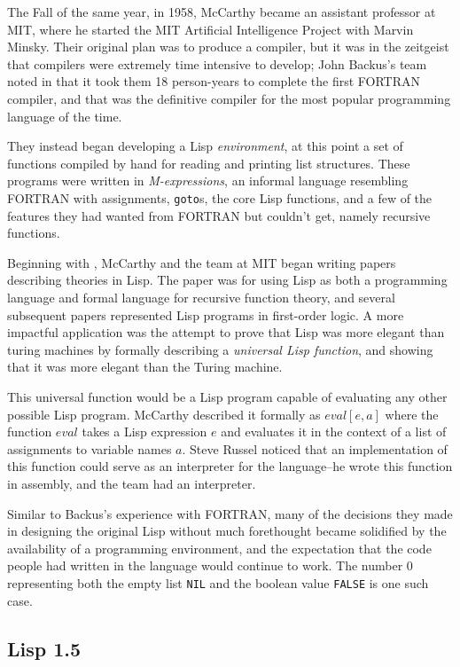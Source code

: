 The Fall of the same year, in 1958,
McCarthy became an assistant professor at MIT, where he started
the MIT Artificial Intelligence Project with Marvin Minsky.
Their original plan was to produce a compiler, but it
was in the zeitgeist that compilers were extremely time intensive
to develop; John Backus's team noted in 
that it took them 18 person-years to complete the first FORTRAN compiler,
and that was the definitive compiler for the most popular
programming language of the time.

They instead began developing a Lisp \textit{environment}, at this point a set of
functions compiled by hand for reading and printing list structures.
These programs were written in \textit{M-expressions}, an informal language resembling
FORTRAN with assignments, \texttt{goto}s, the core Lisp functions, and a few
of the features they had wanted from FORTRAN but couldn't get, namely recursive functions.

Beginning with , McCarthy and the
team at MIT began writing papers describing theories in Lisp.
The \citeyear{mccarthy_recursive_functions_computation_1960} paper was for using Lisp
as both a programming language and formal language for recursive function theory,
and several subsequent papers represented Lisp programs in first-order logic.
A more impactful application was the attempt to prove that Lisp was more elegant than
turing machines by formally describing a \textit{universal Lisp function},
and showing that it was more elegant than the Turing machine.

This universal function would be a Lisp program capable of evaluating
any other possible Lisp program. McCarthy described it formally as $eval[e, a]$
where the function $eval$ takes a Lisp expression $e$ and evaluates it in the context
of a list of assignments to variable names $a$.
Steve Russel noticed that an implementation of this function could
serve as an interpreter for the language--he wrote this function
in assembly, and the team had an interpreter.

Similar to Backus's experience with FORTRAN, many of the decisions they made
in designing the original Lisp without much forethought became solidified
by the availability of a programming environment, and the expectation that
the code people had written in the language would continue to work.
The number 0 representing both the empty list \texttt{NIL} and the boolean value
\texttt{FALSE} is one such case.

\subsection{Lisp 1.5}

